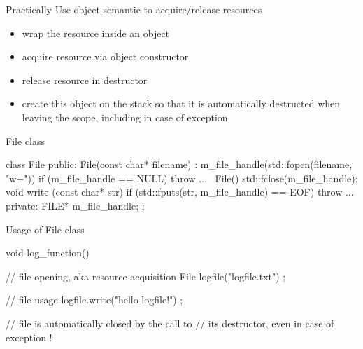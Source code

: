\begin{frame}
  \begin{block}{Practically}
    Use object semantic to acquire/release resources
    \begin{itemize}
    \item wrap the resource inside an object
    \item acquire resource via object constructor
    \item release resource in destructor
    \item create this object on the stack so that it is automatically destructed when leaving the scope, including in case of exception
    \end{itemize}
  \end{block}
\end{frame}

\begin{frame}[fragile]
  \begin{exampleblock}{File class}
    \begin{cppcode*}{}
      class File {
      public:
        File(const char* filename) :
          m_file_handle(std::fopen(filename, "w+")) {
          if (m_file_handle == NULL) { throw ... }
        }
        ~File() { std::fclose(m_file_handle); }
        void write (const char* str) {
          if (std::fputs(str, m_file_handle) == EOF) {
            throw ...
          }
        }
      private:
        FILE* m_file_handle;
      };
    \end{cppcode*}
  \end{exampleblock}
\end{frame}

\begin{frame}[fragile]
  \begin{exampleblock}{Usage of File class}
    \begin{cppcode*}{}
      void log_function() {
        // file opening, aka resource acquisition
        File logfile("logfile.txt") ;

        // file usage
        logfile.write("hello logfile!") ;

        // file is automatically closed by the call to
        // its destructor, even in case of exception !
      }
    \end{cppcode*}
  \end{exampleblock}
\end{frame}

